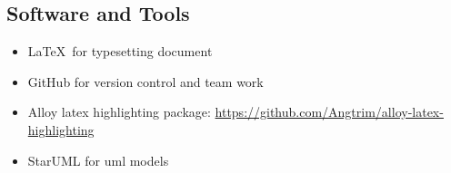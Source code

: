 \subsection{Software and Tools}
\begin{itemize}
\item
	\LaTeX\ for typesetting document
\item
	GitHub for version control and team work
\item
	Alloy latex highlighting package: \href{https://github.com/Angtrim/alloy-latex-highlighting}{https://github.com/Angtrim/alloy-latex-highlighting}
\item
	StarUML for uml models
\end{itemize}